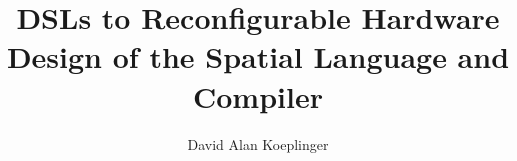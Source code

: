 \documentclass{report}
\begin{document}
\title{DSLs to Reconfigurable Hardware\\Design of the Spatial Language and Compiler}
\author{David Alan Koeplinger}

\beforepreface
{}




\afterpreface









\appendix


\end{document}
